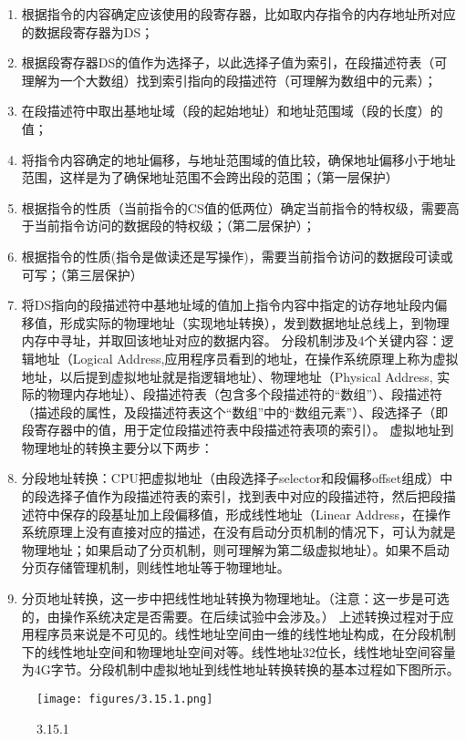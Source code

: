 \begin{enumerate}
\def\labelenumi{\arabic{enumi}.}
\tightlist
\item
  根据指令的内容确定应该使用的段寄存器，比如取内存指令的内存地址所对应的数据段寄存器为DS；
\item
  根据段寄存器DS的值作为选择子，以此选择子值为索引，在段描述符表（可理解为一个大数组）找到索引指向的段描述符（可理解为数组中的元素）；
\item
  在段描述符中取出基地址域（段的起始地址）和地址范围域（段的长度）的值；
\item
  将指令内容确定的地址偏移，与地址范围域的值比较，确保地址偏移小于地址范围，这样是为了确保地址范围不会跨出段的范围；（第一层保护）
\item
  根据指令的性质（当前指令的CS值的低两位）确定当前指令的特权级，需要高于当前指令访问的数据段的特权级；（第二层保护）；
\item
  根据指令的性质(指令是做读还是写操作)，需要当前指令访问的数据段可读或可写；（第三层保护）
\item
  将DS指向的段描述符中基地址域的值加上指令内容中指定的访存地址段内偏移值，形成实际的物理地址（实现地址转换），发到数据地址总线上，到物理内存中寻址，并取回该地址对应的数据内容。
  分段机制涉及4个关键内容：逻辑地址（Logical
  Address,应用程序员看到的地址，在操作系统原理上称为虚拟地址，以后提到虚拟地址就是指逻辑地址）、物理地址（Physical
  Address,
  实际的物理内存地址）、段描述符表（包含多个段描述符的``数组''）、段描述符（描述段的属性，及段描述符表这个``数组''中的``数组元素''）、段选择子（即段寄存器中的值，用于定位段描述符表中段描述符表项的索引）。
  虚拟地址到物理地址的转换主要分以下两步：
\item
  分段地址转换：CPU把虚拟地址（由段选择子selector和段偏移offset组成）中的段选择子值作为段描述符表的索引，找到表中对应的段描述符，然后把段描述符中保存的段基址加上段偏移值，形成线性地址（Linear
  Address，在操作系统原理上没有直接对应的描述，在没有启动分页机制的情况下，可认为就是物理地址；如果启动了分页机制，则可理解为第二级虚拟地址）。如果不启动分页存储管理机制，则线性地址等于物理地址。
\item
  分页地址转换，这一步中把线性地址转换为物理地址。（注意：这一步是可选的，由操作系统决定是否需要。在后续试验中会涉及。）
  上述转换过程对于应用程序员来说是不可见的。线性地址空间由一维的线性地址构成，在分段机制下的线性地址空间和物理地址空间对等。线性地址32位长，线性地址空间容量为4G字节。分段机制中虚拟地址到线性地址转换转换的基本过程如下图所示。
\end{enumerate}

\begin{figure}[htbp]
\centering
\texttt{[image: figures/3.15.1.png]}
\caption{3.15.1}
\end{figure}

